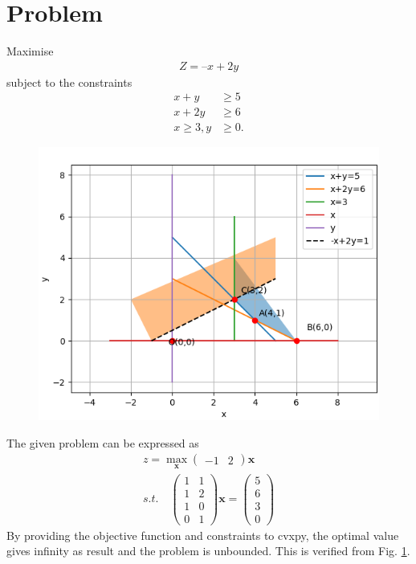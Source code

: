 \documentclass[10pt, a4paper]{article}
\title{\mytitle}
\author{\myauthor\hspace{1em}\\\contact\\FWC22011\hspace{6.5em}IITH\hspace{0.5em}\mymodule\hspace{6em}Optimization:Basic}
\date{}
\newcommand{\myvec}[1]{\ensuremath{\begin{pmatrix}#1\end{pmatrix}}}
\let\vec\mathbf
\begin{document}
	\maketitle
	\tableofcontents
   \section{Problem}
   \fi
Maximise 
\begin{align}
Z = – x + 2y
\end{align}
 subject to the constraints
\begin{align}
	x + y &\geq 5
	\\
	x + 2y &\geq 6
	\\
	x \geq 3, y &\geq 0.
\end{align}
	\begin{figure}[!ht]
		\centering
		\includegraphics[width=\columnwidth]{12/12/1/9/figs/image.png}
		\caption{}
		\label{fig:12/12/1/9}
  	\end{figure}
\solution
The given problem can be expressed as
\begin{align}
z = \max_\vec{x}\myvec{-1 &2}\vec{x}
\\
s.t. \quad
    \myvec{1&1\\1&2\\1&0\\0&1}\vec{x}=\myvec{5\\6\\3\\0}
\end{align}
By providing the objective function and constraints to cvxpy, the optimal value gives infinity as result and the problem is unbounded.
This is verified from Fig. 
		\ref{fig:12/12/1/9}.
		\iffalse
\end{document}
